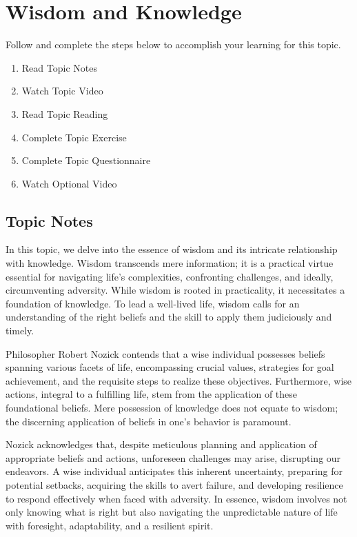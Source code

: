 \documentclass[
]{book}
\providecommand{\tightlist}{%
  \setlength{\itemsep}{0pt}\setlength{\parskip}{0pt}}
\begin{document}
\hypertarget{wisdom-and-knowledge}{%
\section{Wisdom and Knowledge}\label{wisdom-and-knowledge}}

Follow and complete the steps below to accomplish your learning for this topic.

\begin{enumerate}
\def\labelenumi{\arabic{enumi}.}
\tightlist
\item
  Read Topic Notes
\item
  Watch Topic Video
\item
  Read Topic Reading
\item
  Complete Topic Exercise
\item
  Complete Topic Questionnaire
\item
  Watch Optional Video
\end{enumerate}

\hypertarget{topic-notes}{%
\subsection*{Topic Notes}\label{topic-notes}}

In this topic, we delve into the essence of wisdom and its intricate relationship with knowledge. Wisdom transcends mere information; it is a practical virtue essential for navigating life's complexities, confronting challenges, and ideally, circumventing adversity. While wisdom is rooted in practicality, it necessitates a foundation of knowledge. To lead a well-lived life, wisdom calls for an understanding of the right beliefs and the skill to apply them judiciously and timely.

Philosopher Robert Nozick contends that a wise individual possesses beliefs spanning various facets of life, encompassing crucial values, strategies for goal achievement, and the requisite steps to realize these objectives. Furthermore, wise actions, integral to a fulfilling life, stem from the application of these foundational beliefs. Mere possession of knowledge does not equate to wisdom; the discerning application of beliefs in one's behavior is paramount.

Nozick acknowledges that, despite meticulous planning and application of appropriate beliefs and actions, unforeseen challenges may arise, disrupting our endeavors. A wise individual anticipates this inherent uncertainty, preparing for potential setbacks, acquiring the skills to avert failure, and developing resilience to respond effectively when faced with adversity. In essence, wisdom involves not only knowing what is right but also navigating the unpredictable nature of life with foresight, adaptability, and a resilient spirit.
\end{document}
